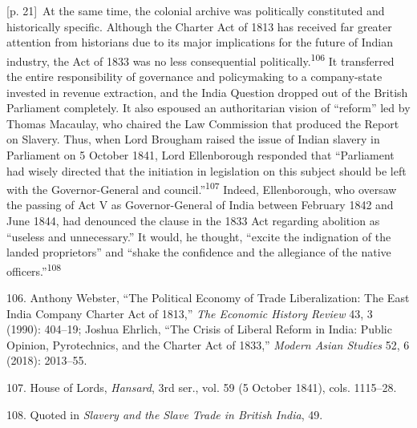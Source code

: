 \documentclass[10pt,a4paper]{article}
\begin{document}
{\scriptsize\color{gray} [p. 21]}\ At the same time, the colonial archive was politically constituted and historically specific. Although the Charter Act of 1813 has received far greater attention from historians due to its major implications for the future of Indian industry, the Act of 1833 was no less consequential politically.\nobreak\textsuperscript{106} It transferred the entire responsibility of governance and policymaking to a company-state invested in revenue extraction, and the India Question dropped out of the British Parliament completely. It also espoused an authoritarian vision of “reform” led by Thomas Macaulay, who chaired the Law Commission that produced the Report on Slavery. Thus, when Lord Brougham raised the issue of Indian slavery in Parliament on 5 October 1841, Lord Ellenborough responded that “Parliament had wisely directed that the initiation in legislation on this subject should be left with the Governor-General and council.”\nobreak\textsuperscript{107} Indeed, Ellenborough, who oversaw the passing of Act V as Governor-General of India between February 1842 and June 1844, had denounced the clause in the 1833 Act regarding abolition as “useless and unnecessary.” It would, he thought, “excite the indignation of the landed proprietors” and “shake the confidence and the allegiance of the native officers.”\nobreak\textsuperscript{108}\par{\small 106. Anthony Webster, “The Political Economy of Trade Liberalization: The East India Company Charter Act of 1813,” \textit{The Economic History Review} 43, 3 (1990): 404–19; Joshua Ehrlich, “The Crisis of Liberal Reform in India: Public Opinion, Pyrotechnics, and the Charter Act of 1833,” \textit{Modern Asian Studies} 52, 6 (2018): 2013–55.\par}{\small 107. House of Lords, \textit{Hansard}, 3rd ser., vol. 59 (5 October 1841), cols. 1115–28.\par}{\small 108. Quoted in \textit{Slavery and the Slave Trade in British India}, 49.\par}
\end{document}
